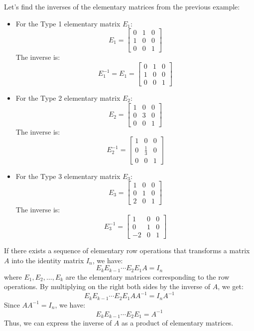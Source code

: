 \begin{eg}
    Let's find the inverses of the elementary matrices from the previous example:
    \begin{itemize}[itemsep=1pt,label=$\circ$]
        \item For the Type 1 elementary matrix \( E_1 \):
        \[
            E_1 = \begin{bmatrix}
                0 & 1 & 0 \\
                1 & 0 & 0 \\
                0 & 0 & 1
            \end{bmatrix}
        \]
        The inverse is:
        \[
            E_1^{-1} = E_1 = \begin{bmatrix}
                0 & 1 & 0 \\
                1 & 0 & 0 \\
                0 & 0 & 1
            \end{bmatrix}
        \]
        \item For the Type 2 elementary matrix \( E_2 \):
        \[
            E_2 = \begin{bmatrix}
                1 & 0 & 0 \\
                0 & 3 & 0 \\
                0 & 0 & 1
            \end{bmatrix}
        \]
        The inverse is:
        \[
            E_2^{-1} = \begin{bmatrix}
                1 & 0 & 0 \\
                0 & \frac{1}{3} & 0 \\
                0 & 0 & 1
            \end{bmatrix}
        \]
        \item For the Type 3 elementary matrix \( E_3 \):
        \[
            E_3 = \begin{bmatrix}
                1 & 0 & 0 \\
                0 & 1 & 0 \\
                2 & 0 & 1
            \end{bmatrix}
        \]
        The inverse is:
        \[
            E_3^{-1} = \begin{bmatrix}
                1 & 0 & 0 \\
                0 & 1 & 0 \\
                -2 & 0 & 1
            \end{bmatrix}
        \]
    \end{itemize}
\end{eg}
If there exists a sequence of elementary row operations that transforms a matrix \( A \) into the identity matrix \( I_n \), we have:
\[
    E_k E_{k-1} \cdots E_2 E_1 A = I_n
\]
where \( E_1, E_2, \ldots, E_k \) are the elementary matrices corresponding to the row operations. By multiplying on the right both sides by the inverse of $A$, we get:
\[
    E_k E_{k-1} \cdots E_2 E_1 A A^{-1} = I_n A^{-1}
\]
Since \( A A^{-1} = I_n \), we have:
\[
    E_k E_{k-1} \cdots E_2 E_1 = A^{-1}
\]
Thus, we can express the inverse of \( A \) as a product of elementary matrices.

